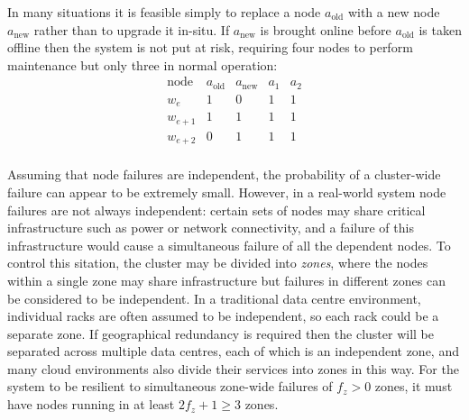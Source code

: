 \documentclass[journal]{IEEEtran}
\begin{document}
In many situations it is feasible simply to replace a node $a_{\textrm{old}}$
with a new node $a_{\textrm{new}}$ rather than to upgrade it in-situ. If
$a_{\textrm{new}}$ is brought online before $a_{\textrm{old}}$ is taken offline
then the system is not put at risk, requiring four nodes to perform maintenance
but only three in normal operation:
\[\begin{array}{rcccc}
\textrm{node}&a_{\textrm{old}}&a_{\textrm{new}}&a_1&a_2 \\
w_e&1&0&1&1\\
w_{e+1}&1&1&1&1\\
w_{e+2}&0&1&1&1\\
\end{array}\]

Assuming that node failures are independent, the probability of a cluster-wide
failure can appear to be extremely small. However, in a real-world system node
failures are not always independent: certain sets of nodes may share critical
infrastructure such as power or network connectivity, and a failure of this
infrastructure would cause a simultaneous failure of all the dependent nodes.
To control this sitation, the cluster may be divided into \textit{zones}, where
the nodes within a single zone may share infrastructure but failures in
different zones can be considered to be independent. In a traditional data
centre environment, individual racks are often assumed to be independent, so
each rack could be a separate zone. If geographical redundancy is required then
the cluster will be separated across multiple data centres, each of which is an
independent zone, and many cloud environments also divide their services into
zones in this way.  For the system to be resilient to simultaneous zone-wide
failures of $f_z > 0$ zones, it must have nodes running in at least $2f_z + 1
\ge 3$ zones.
\end{document}
